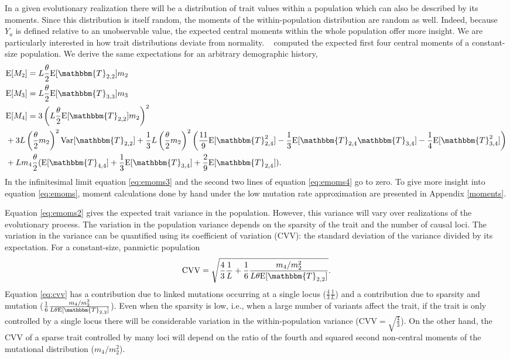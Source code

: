 In a given evolutionary realization there will be a distribution of trait values
within a population which can also be described by its moments. Since this
distribution is itself random, the moments of the within-population distribution
are random as well. Indeed, because $Y_a$ is defined relative to an unobservable
value, the expected central moments within the whole population offer more
insight. We are particularly interested in how trait distributions deviate from
normality. ~\citet{Schraiber2015} computed the expected first four central
moments of a constant-size population. We derive the same expectations for an
arbitrary demographic history,
\begin{subequations} \label{eq:emoms}
\begin{align}
  &\E[M_2] = L \T \E[\mathbbm{T}_{2,2}] m_2 \label{eq:emoms2}\\
  &\E[M_3] = L \T \E[\mathbbm{T}_{3,3}] m_3  \label{eq:emoms3}\\
  &\E[M_4] = 3\left(L \T \E[\mathbbm{T}_{2,2}] m_2\right)^2 \nonumber \\
  &+ 3L \left(\T m_2\right)^2\Var[\mathbbm{T}_{2,2}] + \frac{1}{3}
  L \left(\T m_2\right)^2
    \left( \frac{11}{9} \E[\mathbbm{T}_{2,4}^2]-\frac{1}{3}\E[\mathbbm{T}_{2,4}\mathbbm{T}_{3,4}]-
    \frac{1}{4}\E[\mathbbm{T}_{3,4}^2]\right) \nonumber \\
  &+ L m_4 \T ( \E[\mathbbm{T}_{4,4}] + \frac{1}{3} \E[\mathbbm{T}_{3,4}] +
    \frac{2}{9} \E[\mathbbm{T}_{2,4}] ).
  \label{eq:emoms4}
\end{align}
\end{subequations}
In the infinitesimal limit equation \eqref{eq:emoms3} and the second two lines
of equation \eqref{eq:emoms4} go to zero. To give more insight into equation
\eqref{eq:emoms}, moment calculations done by hand under the low mutation rate
approximation are presented in Appendix \ref{moments}.

Equation \eqref{eq:emoms2} gives the expected trait variance in the population.
However, this variance will vary over realizations of the evolutionary process.
The variation in the population variance depends on the sparsity of the trait
and the number of causal loci. The variation in the variance can be quantified
using its coefficient of variation (CVV): the standard deviation of the variance
divided by its expectation. For a constant-size, panmictic population
\begin{equation}
  \label{eq:cvv}
  \mathrm{CVV} = \sqrt{\frac{4}{3}\frac{1}{L} +
    \frac{1}{6}\frac{m_4/m_2^2}{L\theta \E[\mathbbm{T}_{2,2}]}}.
\end{equation}
Equation \eqref{eq:cvv} has a contribution due to linked mutations occurring at
a single locus ($\frac{4}{3}\frac{1}{L}$) and a contribution due to sparsity and
mutation ($\frac{1}{6}\frac{m_4/m_2^2}{L\theta \E[\mathbbm{T}_{2,2}]}$). Even
when the sparsity is low, i.e., when a large number of variants affect the
trait, if the trait is only controlled by a single locus there will be
considerable variation in the within-population variance
(CVV$=\sqrt{\frac{4}{3}}$). On the other hand, the CVV of a sparse trait
controlled by many loci will depend on the ratio of the fourth and squared
second non-central moments of the mutational distribution ($m_4/m_2^2$).

